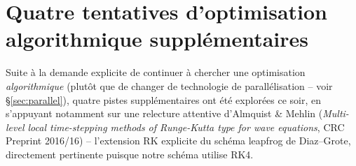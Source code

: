\documentclass[11pt]{article}
\begin{document}
\section{Quatre tentatives d'optimisation algorithmique supplémentaires}
\label{sec:moreattempts}

Suite à la demande explicite de continuer à chercher une optimisation
\emph{algorithmique} (plutôt que de changer de technologie de
parallélisation -- voir \S\ref{sec:parallel}), quatre pistes
supplémentaires ont été explorées ce soir, en s'appuyant notamment sur
une relecture attentive d'Almquist \& Mehlin (\emph{Multi-level local
time-stepping methods of Runge-Kutta type for wave equations}, CRC
Preprint 2016/16) -- l'extension RK explicite du schéma leapfrog de
Diaz--Grote, directement pertinente puisque notre schéma utilise RK4.
\end{document}
